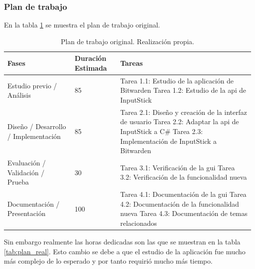 \subsubsection{Plan de trabajo}
En la tabla \ref{tab:plan_original} se muestra el plan de trabajo original.
\begin{table}[H]
\begin{tabular}{|p{}|p{}|p{}|}
\hline
Fases                                & Duración \newline Estimada & Tareas \\ \hline

Estudio previo / Análisis            & 85                & Tarea 1.1: Estudio de la aplicación de Bitwarden \newline Tarea 1.2: Estudio de la \gls{api} de InputStick \\ \hline

Diseño / Desarrollo / Implementación & 85                & Tarea 2.1: Diseño y creación de la interfaz de usuario \newline Tarea 2.2: Adaptar la \gls{api} de InputStick a C\# \newline Tarea 2.3: Implementación de InputStick a Bitwarden \\ \hline

Evaluación / Validación / Prueba     & 30                & Tarea 3.1: Verificación de la \gls{gui} \newline Tarea 3.2: Verificación de la funcionalidad nueva \\ \hline

Documentación / Presentación         & 100               & Tarea 4.1: Documentación de la \gls{gui} \newline Tarea 4.2: Documentación de la funcionalidad nueva \newline Tarea 4.3: Documentación de temas relacionados \\ \hline
\end{tabular}
\caption{Plan de trabajo original. Realización propia.}
\label{tab:plan_original}
\end{table}

Sin embargo realmente las horas dedicadas son las que se muestran en la tabla \ref{tab:plan_real}. Esto cambio se debe a que el estudio de la aplicación fue mucho más complejo de lo esperado y por tanto requirió mucho más tiempo.

